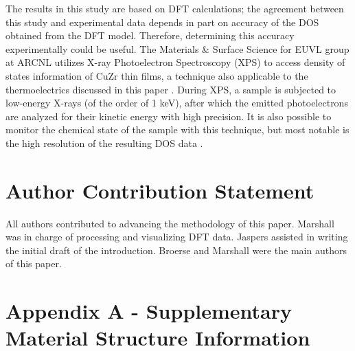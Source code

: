 \documentclass[7.5pt]{article}
\theoremstyle{plain}
\theoremstyle{definition}
\newcommand{\<}{\langle}
\renewcommand{\>}{\rangle}
\begin{document}
\begin{multicols}{2}
The results in this study are based on DFT calculations; the agreement between this study and experimental data depends in part on accuracy of the DOS obtained from the DFT model. Therefore, determining this accuracy experimentally could be useful.
The Materials & Surface Science for EUVL group at ARCNL utilizes X-ray Photoelectron Spectroscopy (XPS) to access density of states information of CuZr thin films, a technique also applicable to the thermoelectrics discussed in this paper \cite{TrogliaAlessandro2022Tmpv}.
During XPS, a sample is subjected to low-energy X-rays (of the order of 1 keV), after which the emitted photoelectrons are analyzed for their kinetic energy with high precision.
It is also possible to monitor the chemical state of the sample with this technique, but most notable is the high resolution of the resulting DOS data \cite{FadleyC.S.1970Edos}. 

\end{multicols}

\smallskip

\section{Author Contribution Statement}

\begin{multicols}{2}

\noindent All authors contributed to advancing the methodology of this paper. 
Marshall was in charge of processing and visualizing DFT data. 
Jaspers assisted in writing the initial draft of the introduction.
Broerse and Marshall were the main authors of this paper.

\end{multicols}

\medskip


\printbibliography


\clearpage

\pagebreak

\appendix

\section{Appendix A - Supplementary Material Structure Information}

\setcounter{figure}{0}
\renewcommand{\thefigure}{\thesection.\arabic{figure}}%
\end{document}
